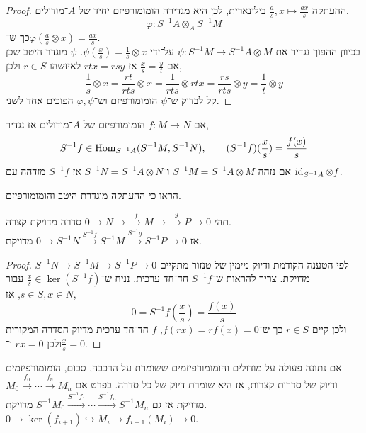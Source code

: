 \begin{proof}
	ההעתקה $\frac{a}{s}, x \mapsto \frac{a x}{s}$ בילינארית, לכן היא מגדירה הומומורפיזם יחיד של $A$־מודולים,
	\[
		\varphi : S^{-1} A \otimes_A S^{-1} M
	\]
	כך ש־$\varphi(\frac{a}{s} \otimes x) = \frac{a x}{s}$. \\
	בכיוון ההפוך נגדיר את $\psi : S^{-1} M \to S^{-1} A \otimes M$ על־ידי $\psi(\frac{x}{s}) = \frac{1}{s} \otimes x$.
	$\psi$ מוגדר היטב שכן אם $\frac{x}{s} = \frac{y}{t}$ אז $r t x = r s y$ לאיזשהו $r \in S$ ולכן,
	\[
		\frac{1}{s} \otimes x
		= \frac{r t}{r t s} \otimes x
		= \frac{1}{r t s} \otimes r t x
		= \frac{r s}{r t s} \otimes y
		= \frac{1}{t} \otimes y
	\]
	קל לבדוק ש־$\psi$ הומומורפיזם וש־$\varphi, \psi$ הפוכים אחד לשני.
\end{proof}
\begin{definition}
	אם $f : M \to N$ הומומורפיזם של $A$־מודולים אז נגדיר,
	\[
		S^{-1} f
		\in \operatorname{Hom}_{S^{-1} A}(S^{-1} M, S^{-1} N),
		\qquad
		(S^{-1} f)(\frac{x}{s})
		= \frac{f(x)}{s}
	\]
	אם נזהה $S^{-1} M = S^{-1} A \otimes M$ ו־$S^{-1} N = S^{-1} A \otimes N$ אז $S^{-1} f$ מזדהה עם $\operatorname{id}_{S^{-1} A} \otimes f$.
\end{definition}
\begin{exercise}
	הראו כי ההעתקה מוגדרת היטב והומומורפיזם.
\end{exercise}
\begin{proposition}
	תהי $0 \to N \to \xrightarrow{f} M \to \xrightarrow{g} P \to 0$ סדרה מדויקת קצרה. \\
	אז $0 \to S^{-1} N \xrightarrow{S^{-1} f} S^{-1} M \xrightarrow{S^{-1} g} S^{-1} P \to 0$ מדויקת.
\end{proposition}
\begin{proof}
	לפי הטענה הקודמת ודיוק מימין של טנזור מתקיים $S^{-1} N \to S^{-1} M \to S^{-1} P \to 0$ מדויקת.
	צריך להראות ש־$S^{-1} f$ חד־חד ערכית.
	נניח ש־$\frac{x}{s} \in \ker(S^{-1} f)$ עבור $s \in S, x \in N$, אז,
	\[
		0
		= S^{-1} f(\frac{x}{s})
		= \frac{f(x)}{s}
	\]
	ולכן קיים $r \in S$ כך ש־$f(r x) = r f(x) = 0$, $f$ חד־חד ערכית מדיוק הסדרה המקורית ולכן $r x = 0$ ו־$\frac{x}{s} = 0$.
\end{proof}
\begin{remark}
	אם נתונה פעולה על מודולים והומומורפיזמים ששומרת על הרכבה, סכום, הומומורפיזמים ודיוק של סדרות קצרות, אז היא שומרת דיוק של כל סדרה.
	בפרט אם $M_0 \xrightarrow{f_0} \cdots \xrightarrow{f_n} M_n$ מדויקת אז גם $S^{-1} M_0 \xrightarrow{S^{-1} f_1} \cdots \xrightarrow{S^{-1} f_n} S^{-1} M_n$ מדויקת.
	$0 \to \ker(f_{i + 1}) \hookrightarrow M_i \to f_{i + 1}(M_i) \to 0$.
\end{remark}

